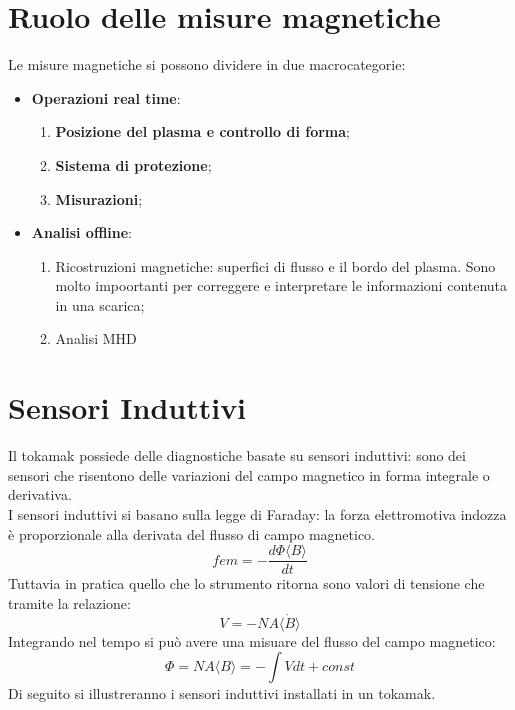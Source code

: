 \documentclass{article}
\begin{document}
\section{Ruolo delle misure magnetiche}
Le misure magnetiche si possono dividere in due macrocategorie:
\begin{itemize}
    \item \textbf{Operazioni real time}:\begin{enumerate}
        \item \textbf{Posizione del plasma e controllo di forma};
        \item \textbf{Sistema di protezione};
        \item \textbf{Misurazioni};
    \end{enumerate}
    \item \textbf{Analisi offline}:
    \begin{enumerate}
        \item Ricostruzioni magnetiche: superfici di flusso e il bordo del plasma. Sono molto impoortanti per correggere e interpretare le informazioni contenuta in una scarica;
        \item Analisi MHD
    \end{enumerate}
\end{itemize}
\section{Sensori Induttivi}
Il tokamak possiede delle diagnostiche basate su sensori induttivi: sono dei sensori che risentono delle variazioni del campo magnetico in forma integrale o derivativa.\\
I sensori induttivi si basano sulla legge di Faraday: la forza elettromotiva indozza è proporzionale alla derivata del flusso di campo magnetico.\begin{equation}
    fem=-\frac{d \Phi\langle B\rangle }{dt}
\end{equation}
Tuttavia in pratica quello che lo strumento ritorna sono valori di tensione che tramite la relazione:
\begin{equation}
    V=-NA\langle \dot{B}\rangle
\end{equation}
Integrando nel tempo si può avere una misuare del flusso del campo magnetico:\begin{equation}
    \Phi=NA\langle B\rangle =-\int Vdt+const
\end{equation}
Di seguito si illustreranno i sensori induttivi installati in un tokamak.
\end{document}
